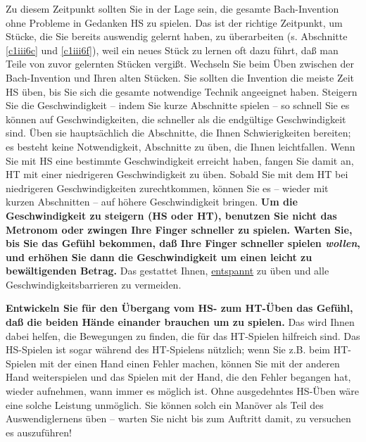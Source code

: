 Zu diesem Zeitpunkt sollten Sie in der Lage sein, die gesamte Bach-Invention ohne Probleme in Gedanken HS zu spielen.
Das ist der richtige Zeitpunkt, um Stücke, die Sie bereits auswendig gelernt haben, zu überarbeiten (s. Abschnitte \hyperref[c1iii6c]{\autoref{c1iii6c}} und \hyperref[c1iii6f]{\autoref{c1iii6f}}), weil ein neues Stück zu lernen oft dazu führt, daß man Teile von zuvor gelernten Stücken vergißt.
Wechseln Sie beim Üben zwischen der Bach-Invention und Ihren alten Stücken.
Sie sollten die Invention die meiste Zeit HS üben, bis Sie sich die gesamte notwendige Technik angeeignet haben.
Steigern Sie die Geschwindigkeit -- indem Sie kurze Abschnitte spielen -- so schnell Sie es können auf Geschwindigkeiten, die schneller als die endgültige Geschwindigkeit sind.
Üben sie hauptsächlich die Abschnitte, die Ihnen Schwierigkeiten bereiten; es besteht keine Notwendigkeit, Abschnitte zu üben, die Ihnen leichtfallen.
Wenn Sie mit HS eine bestimmte Geschwindigkeit erreicht haben, fangen Sie damit an, HT mit einer niedrigeren Geschwindigkeit zu üben.
Sobald Sie mit dem HT bei niedrigeren Geschwindigkeiten zurechtkommen, können Sie es -- wieder mit kurzen Abschnitten -- auf höhere Geschwindigkeit bringen.
\textbf{Um die Geschwindigkeit zu steigern (HS oder HT), benutzen Sie nicht das Metronom oder zwingen Ihre Finger schneller zu spielen. Warten Sie, bis Sie das Gefühl bekommen, daß Ihre Finger schneller spielen \textit{wollen}, und erhöhen Sie dann die Geschwindigkeit um einen leicht zu bewältigenden Betrag.}
Das gestattet Ihnen, \hyperref[c1ii14]{entspannt} zu üben und alle Geschwindigkeitsbarrieren zu vermeiden.

\textbf{Entwickeln Sie für den Übergang vom HS- zum HT-Üben das Gefühl, daß die beiden Hände einander brauchen um zu spielen.}
Das wird Ihnen dabei helfen, die Bewegungen zu finden, die für das HT-Spielen hilfreich sind.
Das HS-Spielen ist sogar während des HT-Spielens nützlich; wenn Sie z.B. beim HT-Spielen mit der einen Hand einen Fehler machen, können Sie mit der anderen Hand weiterspielen und das Spielen mit der Hand, die den Fehler begangen hat, wieder aufnehmen, wann immer es möglich ist.
Ohne ausgedehntes HS-Üben wäre eine solche Leistung unmöglich.
Sie können solch ein Manöver als Teil des Auswendiglernens üben -- warten Sie nicht bis zum Auftritt damit, zu versuchen es auszuführen!

